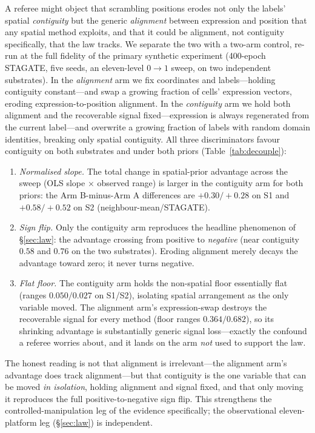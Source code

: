 \documentclass[journal]{IEEEtran}
\begin{document}
A referee might object that scrambling positions
erodes not only the labels' spatial \emph{contiguity} but the generic \emph{alignment} between
expression and position that any spatial method exploits, and that it could be alignment, not
contiguity specifically, that the law tracks. We separate the two with a two-arm control, re-run at
the full fidelity of the primary synthetic experiment (400-epoch STAGATE, five seeds, an eleven-level
$0\!\to\!1$ sweep, on two independent substrates). In the \emph{alignment} arm we fix coordinates and
labels---holding contiguity constant---and swap a growing fraction of cells' expression vectors,
eroding expression-to-position alignment. In the \emph{contiguity} arm we hold both alignment and the
recoverable signal fixed---expression is always regenerated from the current label---and overwrite a
growing fraction of labels with random domain identities, breaking only spatial contiguity. All three
discriminators favour contiguity on both substrates and under both priors (Table~\ref{tab:decouple}):
\begin{enumerate}\setlength{\itemsep}{2pt}
\item \emph{Normalised slope.} The total change in spatial-prior advantage across the sweep (OLS slope
$\times$ observed range) is larger in the contiguity arm for both priors: the Arm B-minus-Arm A
differences are $+0.30/+0.28$ on S1 and $+0.58/+0.52$ on S2 (neighbour-mean/STAGATE).
\item \emph{Sign flip.} Only the contiguity arm reproduces the headline phenomenon of \S\ref{sec:law}:
the advantage crossing from positive to \emph{negative} (near contiguity $0.58$ and $0.76$ on the two
substrates). Eroding alignment merely decays the advantage toward zero; it never turns negative.
\item \emph{Flat floor.} The contiguity arm holds the non-spatial floor essentially flat (ranges
$0.050/0.027$ on S1/S2), isolating spatial arrangement as the only variable moved. The alignment arm's
expression-swap destroys the recoverable signal for every method (floor ranges $0.364/0.682$), so its
shrinking advantage is substantially generic signal loss---exactly the confound a referee worries about,
and it lands on the arm \emph{not} used to support the law.
\end{enumerate}
The honest reading is not that alignment is irrelevant---the alignment arm's advantage does track
alignment---but that contiguity is the one variable that can be moved \emph{in isolation}, holding
alignment and signal fixed, and that only moving it reproduces the full positive-to-negative sign flip.
This strengthens the controlled-manipulation leg of the evidence specifically; the observational
eleven-platform leg (\S\ref{sec:law}) is independent.
\end{document}
